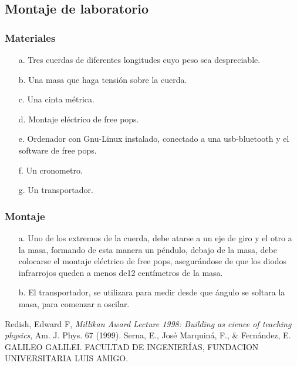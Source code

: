 \documentclass[12pt]{article}
\begin{document}
\begin{multicols}{2}
\subsection{Montaje de laboratorio}
\subsubsection{Materiales}
\begin{enumerate}
\item[a. ] Tres cuerdas de diferentes longitudes cuyo peso sea despreciable.
\item[b. ] Una masa que haga tensión sobre la cuerda.
\item[c. ] Una cinta métrica.
\item[d. ] Montaje eléctrico de free pops.
\item[e. ] Ordenador con Gnu-Linux instalado, conectado a una usb-bluetooth y el software de free pops.
\item[f. ] Un cronometro. 
\item[g. ] Un transportador. 
\end{enumerate}

\subsubsection{Montaje}

\begin{enumerate}
\item[a. ] Uno de los extremos de la cuerda, debe atarse a un eje de giro y el otro a la masa, formando de esta manera un péndulo,  debajo de la masa, debe colocarse el montaje eléctrico de free pops, asegurándose de que los diodos infrarrojos queden a menos de12  centímetros  de la masa.
\item[b. ] El transportador, se  utilizara para medir desde que ángulo se soltara la masa, para comenzar a oscilar.
\end{enumerate}


\end{multicols}
\begin{thebibliography}{99}
 Redish, Edward F, \emph{Millikan Award Lecture 1998: Building as cience of teaching physics}, Am. J. Phys. 67 (1999).
 Serna, E., José Marquiná, F., \& Fernández, E. GALILEO GALILEI. FACULTAD DE INGENIERÍAS, FUNDACION UNIVERSITARIA LUIS AMIGO.

\end{thebibliography}
\end{document}
